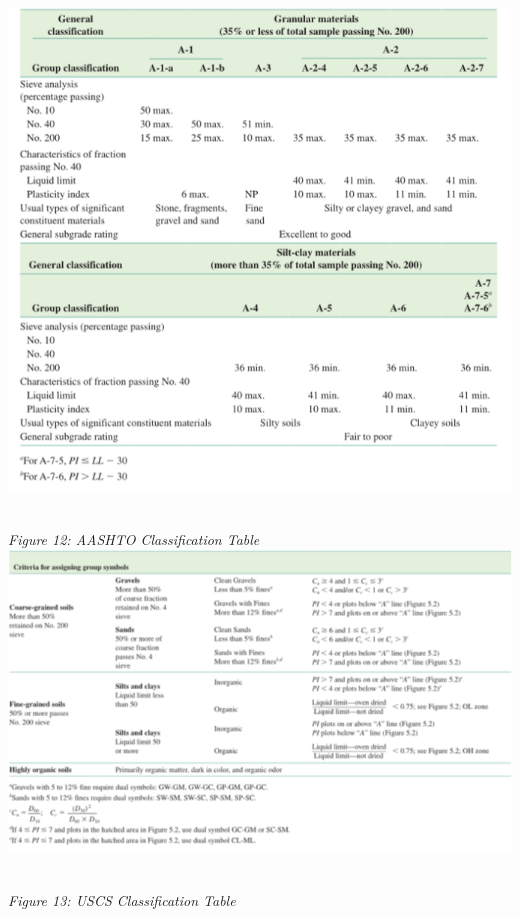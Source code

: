 \documentclass{article}
\begin{document}
\begin{center}
\includegraphics*[scale=0.5]{fig3.png}
\emph{\\Figure 12: AASHTO Classification Table\\}
\includegraphics*[scale=0.8]{fig4.png}
\emph{\\Figure 13: USCS Classification Table\\}

\end{center}
\end{document}
